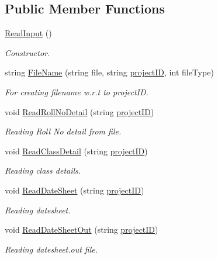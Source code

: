 \subsection*{Public Member Functions}
\begin{DoxyCompactItemize}
\item 
\hyperlink{classReadInput_a181da3d718520ea9168808dde2d3e867}{Read\-Input} ()
\begin{DoxyCompactList}\small\item\em Constructor. \end{DoxyCompactList}\item 
string \hyperlink{classReadInput_a990ac303132881774253593565e85bd0}{File\-Name} (string file, string \hyperlink{classReadInput_a3ad470a25b3e0a29466bf4ff1f7d8e81}{project\-I\-D}, int file\-Type)
\begin{DoxyCompactList}\small\item\em For creating filename w.\-r.\-t to project\-I\-D. \end{DoxyCompactList}\item 
void \hyperlink{classReadInput_a6a901973196e63579e4452fede5ce01e}{Read\-Roll\-No\-Detail} (string \hyperlink{classReadInput_a3ad470a25b3e0a29466bf4ff1f7d8e81}{project\-I\-D})
\begin{DoxyCompactList}\small\item\em Reading Roll No detail from file. \end{DoxyCompactList}\item 
void \hyperlink{classReadInput_aff1e359dc8b72c710bb15647ff4e78da}{Read\-Class\-Detail} (string \hyperlink{classReadInput_a3ad470a25b3e0a29466bf4ff1f7d8e81}{project\-I\-D})
\begin{DoxyCompactList}\small\item\em Reading class details. \end{DoxyCompactList}\item 
void \hyperlink{classReadInput_a582c57e19fd218bfdc8b83d6e8599ea2}{Read\-Date\-Sheet} (string \hyperlink{classReadInput_a3ad470a25b3e0a29466bf4ff1f7d8e81}{project\-I\-D})
\begin{DoxyCompactList}\small\item\em Reading datesheet. \end{DoxyCompactList}\item 
void \hyperlink{classReadInput_aa8c2bc34575b32291e05bc00515530e5}{Read\-Date\-Sheet\-Out} (string \hyperlink{classReadInput_a3ad470a25b3e0a29466bf4ff1f7d8e81}{project\-I\-D})
\begin{DoxyCompactList}\small\item\em Reading datesheet.\-out file. \end{DoxyCompactList}\item 

\end{DoxyCompactItemize}
